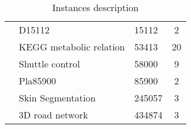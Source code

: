 \begin{table}[H]
\begin{tabular}{@{}lllc@{}}
         & D15112                          & 15112                 & 2                  \\
         & KEGG metabolic relation         & 53413                 & 20                 \\
         & Shuttle control                 & 58000                 & 9                  \\
         & Pla85900                        & 85900                 & 2                  \\
         & Skin Segmentation               & 245057                & 3                  \\
         & 3D road network                 & 434874                & 3                  \\ \bottomrule
\end{tabular}
\caption{Instances description}
\label{instances}
\end{table}